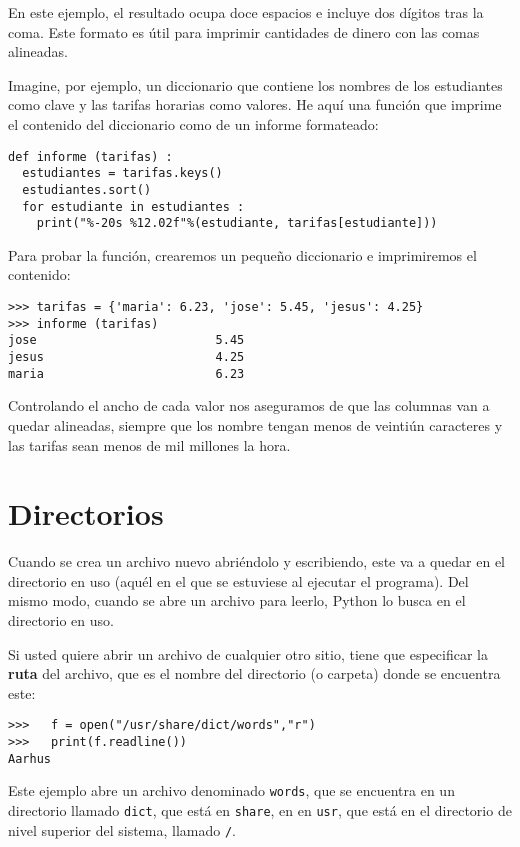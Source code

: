 En este ejemplo, el resultado ocupa doce espacios e incluye dos dígitos
tras la coma. Este formato es útil para imprimir cantidades de dinero
con las comas alineadas.


Imagine, por ejemplo, un diccionario que contiene los nombres de los
estudiantes como clave y las tarifas horarias como valores. He aquí
una función que imprime el contenido del diccionario como de un informe
formateado:
\begin{lstlisting}
def informe (tarifas) :
  estudiantes = tarifas.keys()
  estudiantes.sort()
  for estudiante in estudiantes :
    print("%-20s %12.02f"%(estudiante, tarifas[estudiante]))
\end{lstlisting}

Para probar la función, crearemos un pequeño diccionario e imprimiremos
el contenido:
\begin{lstlisting}
>>> tarifas = {'maria': 6.23, 'jose': 5.45, 'jesus': 4.25}
>>> informe (tarifas)
jose                         5.45
jesus                        4.25
maria                        6.23
\end{lstlisting}

Controlando el ancho de cada valor nos aseguramos de que las columnas
van a quedar alineadas, siempre que los nombre tengan menos de veintiún
caracteres y las tarifas sean menos de mil millones la hora.

\section{Directorios}


Cuando se crea un archivo nuevo abriéndolo y escribiendo, este va
a quedar en el directorio en uso (aquél en el que se estuviese al
ejecutar el programa). Del mismo modo, cuando se abre un archivo para
leerlo, Python lo busca en el directorio en uso.

Si usted quiere abrir un archivo de cualquier otro sitio, tiene que
especificar la \textbf{ruta} del archivo, que es el nombre del directorio
(o carpeta) donde se encuentra este:
\begin{lstlisting}
>>>   f = open("/usr/share/dict/words","r")
>>>   print(f.readline())
Aarhus
\end{lstlisting}

Este ejemplo abre un archivo denominado \texttt{words}, que se encuentra
en un directorio llamado \texttt{dict}, que está en \texttt{share},
en en \texttt{usr}, que está en el directorio de nivel superior del
sistema, llamado \texttt{/}.


